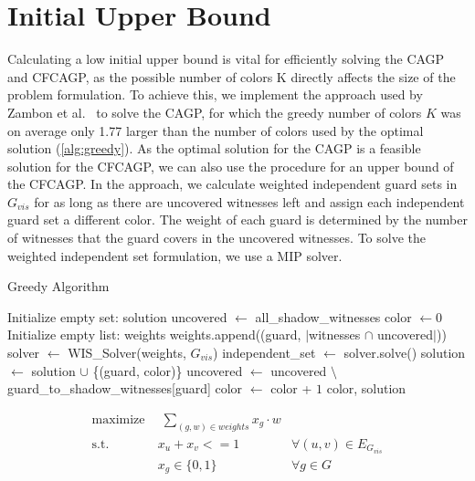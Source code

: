 \section{Initial Upper Bound}
Calculating a low initial upper bound is vital for efficiently solving the CAGP and CFCAGP, as the possible number of colors K directly affects the size of the problem formulation. To achieve this, we implement the approach used by Zambon et al.~\cite{zambon2014exact} to solve the CAGP, for which the greedy number of colors $K$ was on average only 1.77 larger than the number of colors used by the optimal solution (\cref{alg:greedy}). As the optimal solution for the CAGP is a feasible solution for the CFCAGP, we can also use the procedure for an upper bound of the CFCAGP. In the approach, we calculate weighted independent guard sets in $G_{vis}$ for as long as there are uncovered witnesses left and assign each independent guard set a different color. The weight of each guard is determined by the number of witnesses that the guard covers in the uncovered witnesses. To solve the weighted independent set formulation, we use a MIP solver.

\begin{algorithm}
\caption{Greedy Algorithm}\label{alg:greedy}
\fontsize{10}{12}\selectfont
\begin{algorithmic}[1]
\State Initialize empty set: solution
\State uncovered $\gets$ all\_shadow\_witnesses
\State color $\gets 0$
    \State Initialize empty list: weights
        \State weights.append((guard, $|$witnesses $\cap$ uncovered$|$))
    \EndFor
    \State solver $\gets$ WIS\_Solver(weights, $G_{vis}$)
    \State independent\_set $\gets$ solver.solve()
        \State solution $\gets$ solution $\cup$ \{(guard, color)\}
        \State uncovered $\gets$ uncovered $\setminus$ guard\_to\_shadow\_witnesses[guard]
    \EndFor 
    \State color $\gets$ color + $1$
\EndWhile
\State \Return color, solution
\EndProcedure
\end{algorithmic}
\end{algorithm}

\begin{align}
\label{eq_MIP_IS:f.0} \mbox{maximize}~& \;\sum_{(g, w)\in weights} x_{g}\cdot w& \\
\label{eq_MIP_IS:f.1} \mbox{s.t. } &x_{u} + x_{v} <= 1 & \forall (u,v) \in E_{G_{vis}}\\
\label{eq_MIP_IS:f.2}& x_{g} \in \{0,1\} & \forall g\in G
\end{align}


